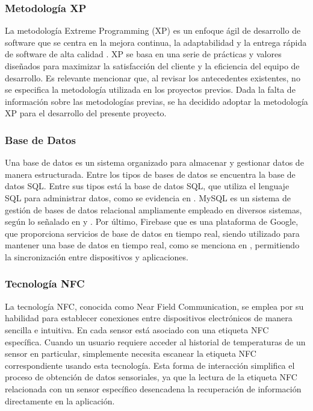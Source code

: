 \subsubsection*{Metodología XP}
La metodología Extreme Programming (XP) es un enfoque ágil de desarrollo de software que se centra en la mejora continua, la adaptabilidad y la entrega rápida de software de alta calidad \cite{cabezas_orellana_alisis_2023}. XP se basa en una serie de prácticas y valores diseñados para maximizar la satisfacción del cliente y la eficiencia del equipo de desarrollo. Es relevante mencionar que, al revisar los antecedentes existentes, no se especifica la metodología utilizada en los proyectos previos. Dada la falta de información sobre las metodologías previas, se ha decidido adoptar la metodología XP para el desarrollo del presente proyecto.

\subsubsection*{Base de Datos}
Una base de datos es un sistema organizado para almacenar y gestionar datos de manera estructurada. Entre los tipos de bases de datos se encuentra la base de datos SQL. Entre sus tipos está la base de datos SQL, que utiliza el lenguaje SQL para administrar datos, como se evidencia en \cite{al-ali_iot-solar_2019}. MySQL es un sistema de gestión de bases de datos relacional ampliamente empleado en diversos sistemas, según lo señalado en \cite{alcivar_dominguez_sistema_2018} y \cite{castillo_herrero_desarrollo_2020}. Por último, Firebase que es una plataforma de Google, que proporciona servicios de base de datos en tiempo real, siendo utilizado para mantener una base de datos en tiempo real, como se menciona en \cite{ramos_galindo_diseno_2023}, permitiendo la sincronización entre dispositivos y aplicaciones.

\subsubsection*{Tecnología NFC}
La tecnología NFC, conocida como Near Field Communication, se emplea por su habilidad para establecer conexiones entre dispositivos electrónicos de manera sencilla e intuitiva. En \cite{haiyan_intelligent_2022} cada sensor está asociado con una etiqueta NFC específica. Cuando un usuario requiere acceder al historial de temperaturas de un sensor en particular, simplemente necesita escanear la etiqueta NFC correspondiente usando esta tecnología. Esta forma de interacción simplifica el proceso de obtención de datos sensoriales, ya que la lectura de la etiqueta NFC relacionada con un sensor específico desencadena la recuperación de información directamente en la aplicación.

